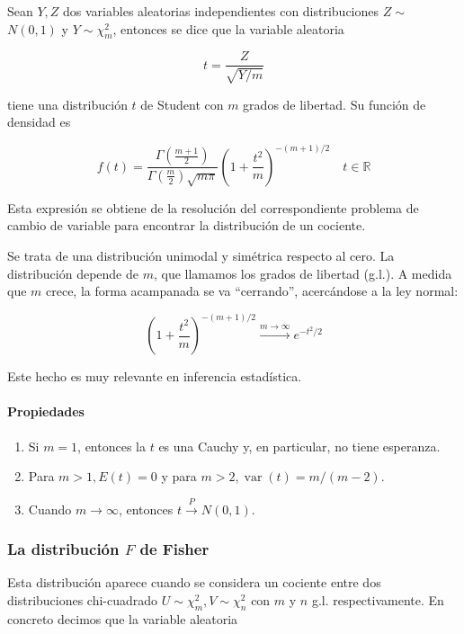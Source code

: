 \documentclass[
]{article}
\providecommand{\tightlist}{%
  \setlength{\itemsep}{0pt}\setlength{\parskip}{0pt}}
\begin{document}
Sean \(Y, Z\) dos variables aleatorias independientes con distribuciones \(Z \sim\) \(N(0,1)\) y \(Y \sim \chi_{m}^{2}\), entonces se dice que la variable aleatoria

\[
t=\frac{Z}{\sqrt{Y / m}}
\]

tiene una distribución \(t\) de Student con \(m\) grados de libertad.
Su función de densidad es

\[
f(t)=\frac{\Gamma\left(\frac{m+1}{2}\right)}{\Gamma\left(\frac{m}{2}\right) \sqrt{m \pi}}\left(1+\frac{t^{2}}{m}\right)^{-(m+1) / 2} \quad t \in \mathbb{R}
\]

Esta expresión se obtiene de la resolución del correspondiente problema de cambio de variable para encontrar la distribución de un cociente.

Se trata de una distribución unimodal y simétrica respecto al cero. La distribución depende de \(m\), que llamamos los grados de libertad (g.l.). A medida que \(m\) crece, la forma acampanada se va ``cerrando'', acercándose a la ley normal:

\[
\left(1+\frac{t^{2}}{m}\right)^{-(m+1) / 2} \xrightarrow{m \rightarrow \infty} e^{-t^{2} / 2}
\]

Este hecho es muy relevante en inferencia estadística.

\paragraph{Propiedades}\label{propiedades-1}

\begin{enumerate}
\def\labelenumi{\arabic{enumi}.}
\tightlist
\item
  Si \(m=1\), entonces la \(t\) es una Cauchy y, en particular, no tiene esperanza.
\item
  Para \(m>1, E(t)=0\) y para \(m>2, \operatorname{var}(t)=m /(m-2)\).
\item
  Cuando \(m \rightarrow \infty\), entonces \(t \xrightarrow{P} N(0,1)\).
\end{enumerate}

\subsubsection{\texorpdfstring{La distribución \(F\) de Fisher}{La distribución F de Fisher}}\label{la-distribuciuxf3n-f-de-fisher}

Esta distribución aparece cuando se considera un cociente entre dos distribuciones chi-cuadrado \(U \sim \chi_{m}^{2}, V \sim \chi_{n}^{2}\) con \(m\) y \(n\) g.l. respectivamente. En concreto decimos que la variable aleatoria
\end{document}
